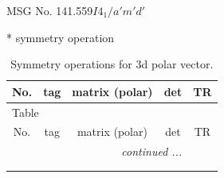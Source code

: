 \documentclass[fleqn,8pt]{jsarticle}
\begin{document}
\setcounter{MaxMatrixCols}{32}

\renewcommand{\tablename}{Table~}
\renewcommand{\figurename}{Figure~}
\begin{center}
\LARGE
MSG No. 141.559\quad$I4_{1}/a'm'd'$
\end{center}
* symmetry operation
\renewcommand{\arraystretch}{1.3}
\begin{longtable}{ccccc}
\caption{Symmetry operations for 3d polar vector.}
 \\
 \hline \hline
No. & tag & matrix (polar) & det & TR \\ \hline \endfirsthead

\multicolumn{4}{l}{\tablename\ \thetable{}} \\
 \hline \hline
No. & tag & matrix (polar) & det & TR \\ \hline \endhead

 \hline \hline
\multicolumn{4}{r}{\footnotesize\it continued ...} \\ \endfoot

 \hline \hline
\multicolumn{4}{r}{} \\ \endlastfoot


\end{longtable}
\end{document}
